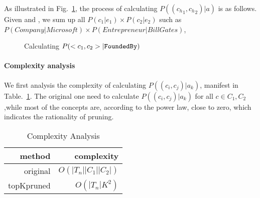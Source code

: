 \begin{example}[Calculating $P(<{c_h}_{1},{c_h}_{2}> |a)$]
\label{exa:pggga}
As illustrated in Fig.~\ref{fig:bipartite}, the process of calculating $P(({c_h}_{1},{c_h}_{2}) |a)$ is as follows.
Given  and , we sum up all $P(c_1|e_1)\times P(c_2|e_2) $ such as $P(Company|Microsoft) \times P(Entrepreneur|Bill Gates)$,
\end{example}


\begin{figure}[!htb]
\centering {}
\caption{Calculating $P( <{c}_{1},{c}_{2}> | {\tt FoundedBy} )$ } \label{fig:bipartite}
\end{figure}

\paragraph{Complexity analysis}

We first analysis the complexity of calculating $P((c_i, c_j)|a_k)$, manifest in Table.~\ref{tab:complexity}. The original one need to calculate $P((c_i, c_j)|a_k)$ for all $c \in C_1,C_2 $,while most of the concepts are, according to the power law, close to zero, which indicates the rationality of pruning.


\begin{table}[htbp]
  \centering
  \caption{Complexity Analysis}
    \begin{tabular}{rr}
    \toprule
    method & complexity \\
    \midrule
    original &  $O(|T_n||C_1||C_2|)$ \\
    topKpruned & $O(|T_n|K^2)$ \\
    \bottomrule
    \end{tabular}%
  \label{tab:complexity}%
\end{table}%


